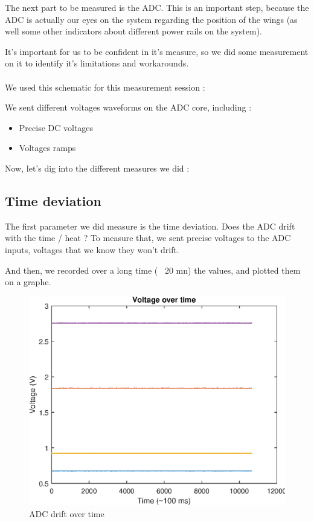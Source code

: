 The next part to be measured is the ADC. This is an important step, because the ADC is actually 
our eyes on the system regarding the position of the wings (as well some other indicators about
different power rails on the system).

It's important for us to be confident in it's measure, so we did some measurement on it to identify 
it's limitations and workarounds.

\paragraph{}
We used this schematic for this measurement session :


We sent different voltages waveforms on the ADC core, including :

\begin{itemize}
    \item Precise DC voltages
    \item Voltages ramps
\end{itemize}

Now, let's dig into the different measures we did :

\FloatBarrier
\subsection{Time deviation}
The first parameter we did measure is the time deviation. Does the ADC drift with the time / heat ?
To measure that, we sent precise voltages to the ADC inputs, voltages that we know they won't drift.

And then, we recorded over a long time (~ 20 mn) the values, and plotted them on a graphe.

\begin{figure}[!hbt]
    \centering
    \includegraphics[width=\SchematicWidth]{images/ADC/time-deviation.eps}
    \caption{ADC drift over time}
\end{figure}
\FloatBarrier

